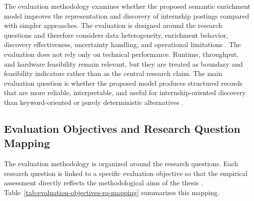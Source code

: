 The evaluation methodology examines whether the proposed semantic enrichment model improves the
representation and discovery of internship postings compared with simpler approaches. The evaluation is
designed around the research questions and therefore considers data heterogeneity, enrichment behavior,
discovery effectiveness, uncertainty handling, and operational limitations \cite{wohlin2012experimentation, peffers2007design}.
The evaluation does not rely only on technical performance. Runtime, throughput, and hardware feasibility
remain relevant, but they are treated as boundary and feasibility indicators rather than as the central research
claim. The main evaluation question is whether the proposed model produces structured records that are more
reliable, interpretable, and useful for internship-oriented discovery than keyword-oriented or purely
deterministic alternatives \cite{voorhees2005trec, jain1991art}.

\subsection{Evaluation Objectives and Research Question Mapping}

The evaluation methodology is organized around the research questions. Each research question is linked to a specific evaluation objective so that the empirical assessment directly reflects the methodological aims of the thesis \cite{peffers2007design, wohlin2012experimentation}. Table~\ref{tab:evaluation-objectives-rq-mapping} summarizes this mapping.

